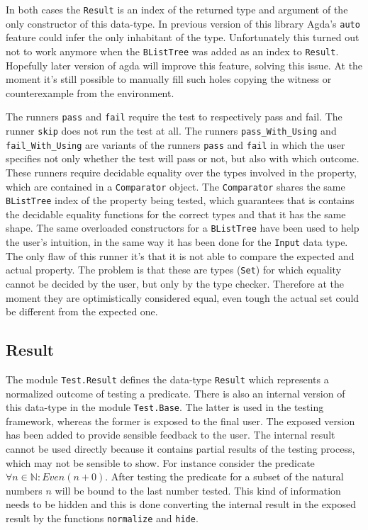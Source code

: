 \documentclass[10pt,a4paper]{article}
\begin{document}
In both cases the \texttt{Result} is an index of the returned type and argument of the only constructor of this data-type. In previous version of this library 
Agda's \texttt{auto} feature could infer the only inhabitant of the type.
Unfortunately this turned out not to work anymore when the \texttt{BListTree} was added as an index to \texttt{Result}. Hopefully later version of agda will improve this feature, solving this issue. At the moment it's still possible to manually fill such holes copying the witness or counterexample from the environment.

The runners \texttt{pass} and \texttt{fail} require the test to respectively pass and fail. The runner \texttt{skip} does not run the test at all.
The runners \texttt{pass\_With\_Using} and \texttt{fail\_With\_Using} are variants of the runners \texttt{pass} and \texttt{fail} in which the user specifies not only whether the test will pass or not, but also with which outcome.
These runners require decidable equality over the types involved in the property, which are contained in a \texttt{Comparator} object.
The \texttt{Comparator} shares the same \texttt{BListTree} index  of the property  being tested, which guarantees that is contains the decidable equality functions for the correct types and that it has the same shape.
The same overloaded constructors for a \texttt{BListTree} have been used to help the user's intuition, in the same way it has been done for the \texttt{Input} data type.
The only flaw of this runner it's that it is not able to compare the expected and actual property. The problem is that these are types (\texttt{Set}) for which equality cannot be decided by the user, but only by the type checker.
Therefore at the moment they are optimistically considered equal, even tough the actual set could be different from the expected one.

\subsection{Result}
\label{sec:Result}
The module \texttt{Test.Result} defines the data-type \texttt{Result} which represents a normalized outcome of testing a predicate.
There is also an internal version of this data-type in the module \texttt{Test.Base}.
The latter is used in the testing framework, whereas the former is exposed to the final user. The exposed version has been added to provide sensible feedback to the user. The internal result cannot be used directly because it contains partial results of the testing process, which may not be sensible to show. For instance consider the predicate $\forall n \in \mathbb{N} : Even (n + 0)$. After testing the predicate for a subset of the natural numbers $n$ will be bound to the last number tested. This kind of information needs to be hidden and this is done converting the internal result in the exposed result by the functions \texttt{normalize} and \texttt{hide}.
\end{document}
